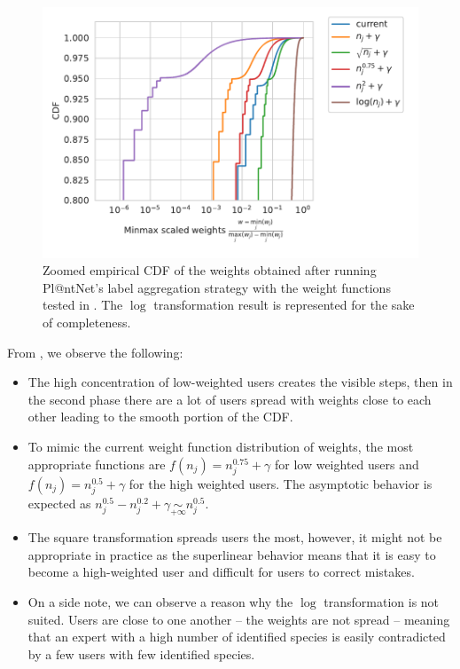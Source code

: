 \begin{figure}[htb]
    \centering
    \includegraphics[width=.75\textwidth]{./images_plantnet/cdf_weights.pdf}
    \caption{Zoomed empirical CDF of the weights obtained after running Pl@ntNet's label aggregation strategy with the weight functions tested in . The $\log$ transformation result is represented for the sake of completeness.}
    \label{fig:cdf_plantnet}
\end{figure}

From , we observe the following:
\begin{itemize}
    \item The high concentration of low-weighted users creates the visible steps, then in the second phase there are a lot of users spread with weights close to each other leading to the smooth portion of the CDF.
    \item To mimic the current weight function distribution of weights, the most appropriate functions are $f(n_j)=n_j^{0.75}+\gamma$ for low weighted users and $f(n_j)=n_j^{0.5}+\gamma$ for the high weighted users. The asymptotic behavior is expected as $n_j^{0.5} - n_j^{0.2}+\gamma  \underset{+\infty}{\sim} n_j^{0.5}$.
    \item The square transformation spreads users the most, however, it might not be appropriate in practice as the superlinear behavior means that it is easy to become a high-weighted user and difficult for users to correct mistakes.
    \item On a side note, we can observe a reason why the $\log$ transformation is not suited. Users are close to one another -- the weights are not spread -- meaning that an expert with a high number of identified species is easily contradicted by a few users with few identified species.
\end{itemize}

